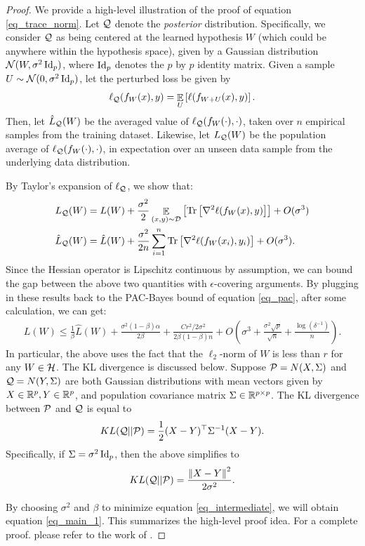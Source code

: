 \begin{proof}
We provide a high-level illustration of the proof of equation \eqref{eq_trace_norm}.
Let $\mathcal{Q}$ denote the \textit{posterior} distribution. Specifically, we consider $\mathcal{Q}$ as being centered at the learned hypothesis $W$ (which could be anywhere within the hypothesis space), given by a Gaussian distribution $\mathcal{N}(W, \sigma^2 \operatorname{Id}_p)$, where $\operatorname{Id}_p$ denotes the $p$ by $p$ identity matrix.
Given a sample $U\sim \mathcal{N}(0, \sigma^2\operatorname{Id}_p)$, let the perturbed loss be given by 
\begin{align}
    \ell_{\mathcal{Q}}(f_W(x), y) = \mathop{\mathbb{E}}_{U}\left[ \ell(f_{W + U}(x), y) \right]. \label{eq_lq}
\end{align}
Then, let $\hat L_{\mathcal{Q}}(W)$ be the averaged value of $\ell_{\mathcal{Q}}(f_W(\cdot), \cdot)$, taken over $n$ empirical samples from the training dataset.
Likewise, let $L_{\mathcal{Q}}(W)$ be the population average of $\ell_{\mathcal{Q}}(f_W(\cdot), \cdot)$, in expectation over an unseen data sample from the underlying data distribution.

By Taylor's expansion of $\ell_{\mathcal{Q}}$, we show that:
\begin{align}
    L_{\mathcal{Q}}(W) &= L(W) + \frac {\sigma^2} 2 \mathop{\mathbb{E}}_{(x,y)\sim\mathcal{D}}\left[ \operatorname{Tr}\left[\nabla^2 \ell(f_{W}(x), y)\right] \right] + O(\sigma^3) \label{eq_taylorh1}\\
    \hat L_{\mathcal{Q}}(W) &= \hat L(W) + \frac {\sigma^2} {2n} \sum_{i = 1}^n \operatorname{Tr}\left[\nabla^2 \ell(f_W(x_i), y_i)\right] + O(\sigma^3). \label{eq_taylorh2}
\end{align}
Since the Hessian operator is Lipschitz continuous by assumption, we can bound the gap between the above two quantities with $\epsilon$-covering arguments. %
By plugging in these results back to the PAC-Bayes bound of equation \eqref{eq_pac}, after some calculation, we can get:
\begin{align}
    L(W) \le \frac 1 {\beta} \hat L(W) + \frac{\sigma^2(1 - \beta) \alpha}{2\beta} + \frac{C r^2 / 2\sigma^2}{2\beta(1 - \beta) n} + O\left(\sigma^3 + \frac{\sigma^2 \sqrt p}{\sqrt n} + \frac{\log(\delta^{-1})}{n}\right). \label{eq_intermediate}
\end{align}
In particular, the above uses the fact that the $\ell_2$-norm of $W$ is less than $r$ for any $W \in \mathcal{H}$. The KL divergence is discussed below.
Suppose $\mathcal{P} = N(X, \Sigma)$ and $\mathcal{Q} = N(Y, \Sigma)$ are both Gaussian distributions with mean vectors given by $X\in\mathbb{R}^p, Y\in\mathbb{R}^p$, and population covariance matrix $\Sigma \in \mathbb{R}^{p \times p}$.
The KL divergence between $\mathcal{P}$ and $\mathcal{Q}$ is equal to
\begin{align*}
    KL(\mathcal{Q}||\mathcal{P}) = \frac{1}{2}(X- Y)^\top \Sigma^{-1} (X - Y).
\end{align*}
Specifically, if $\Sigma = \sigma^2\operatorname{Id}_p$, then the above simplifies to
\begin{align*}
    KL(\mathcal{Q}||\mathcal{P}) = \frac{\left\| X - Y \right\|^2}{2\sigma^2}.
\end{align*}

By choosing $\sigma^2$ and $\beta$ to minimize equation \eqref{eq_intermediate}, we will obtain equation \eqref{eq_main_1}.
This summarizes the high-level proof idea. For a complete proof. please refer to the work of \citet{zhang2024noise}.
\end{proof}